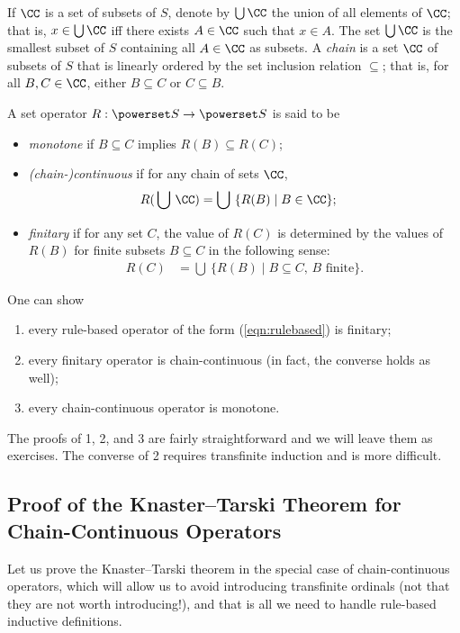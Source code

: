 If $\CC$ is a set of subsets of $S$, denote by $\bigcup\CC$ the union of all elements of $\CC$; that is, $x\in\bigcup\CC$ iff there exists $A\in\CC$ such that $x\in A$. The set $\bigcup\CC$ is the smallest subset of $S$ containing all $A\in\CC$ as subsets. A \emph{chain} is a set $\CC$ of subsets of $S$ that is linearly ordered by the set inclusion relation $\subseteq$; that is, for all $B,C\in\CC$, either $B\subseteq C$ or $C\subseteq B$.

A set operator $R:\powerset S\rightarrow\powerset S$ is said to be
\begin{itemize}
\item \emph{monotone} if $B\subseteq C$ implies $R(B)\subseteq R(C)$;
\item \emph{{\upshape(}chain-{\upshape)}continuous} if for any chain of sets $\CC$,
\begin{align*}
R(\,\bigcup\,\CC) &= \bigcup\ \{R(B) \mid B\in\CC\};
\end{align*}
\item \emph{finitary} if for any set $C$, the value of $R(C)$ is determined by the values of $R(B)$ for finite subsets $B\subseteq C$ in the following sense:
\begin{align*}
R(C) &= \bigcup\ \{R(B) \mid \mbox{$B\subseteq C$, $B$ finite}\}.
\end{align*}
\end{itemize}
One can show
\begin{enumerate}
\item
every rule-based operator of the form (\ref{eqn:rulebased}) is finitary;
\item
every finitary operator is chain-continuous (in fact, the converse holds as well);
\item
every chain-continuous operator is monotone.
\end{enumerate}
The proofs of 1, 2, and 3 are fairly straightforward and we will leave them as exercises. The converse of 2 requires transfinite induction and is more difficult.

\subsection{Proof of the Knaster--Tarski Theorem for Chain-Continuous Operators}

Let us prove the Knaster--Tarski theorem in the special case of chain-continuous operators, which will allow us to avoid introducing transfinite ordinals (not that they are not worth introducing!), and that is all we need to handle rule-based inductive definitions.

